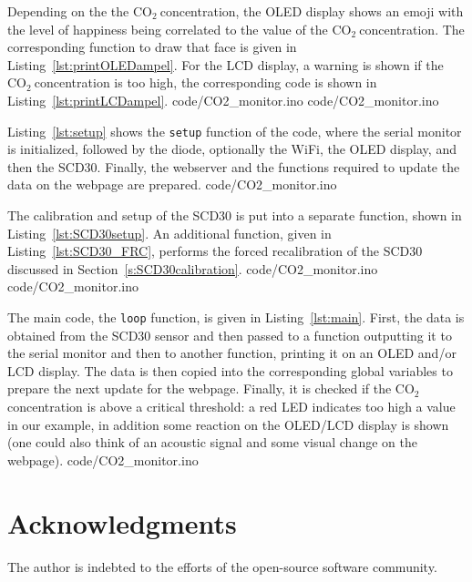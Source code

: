 \documentclass[12pt,a4paper]{article}
\newcommand{\coo}{\ensuremath{\mathrm{CO_2}~}}
\begin{document}
Depending on the the \coo concentration, the OLED display shows an emoji with the level of happiness being correlated to the value of the \coo concentration. The corresponding function to draw that face is given in Listing~\ref{lst:printOLEDampel}. For the LCD display, a warning is shown if the \coo concentration is too high, the corresponding code is shown in Listing~\ref{lst:printLCDampel}.
%
{code/CO2_monitor.ino} 
%
{code/CO2_monitor.ino} 

Listing~\ref{lst:setup} shows the \texttt{setup} function of the code, where the serial monitor is initialized, followed by the diode, optionally the WiFi, the OLED display, and then the SCD30. Finally, the webserver and the functions required to update the data on the webpage are prepared.
%
{code/CO2_monitor.ino}

The calibration and setup of the SCD30 is put into a separate function, shown in Listing~\ref{lst:SCD30setup}. An additional function, given in Listing~\ref{lst:SCD30_FRC}, performs the forced recalibration of the SCD30 discussed in Section~\ref{s:SCD30calibration}.
%
{code/CO2_monitor.ino}
%
{code/CO2_monitor.ino}

The main code, the \texttt{loop} function, is given in Listing~\ref{lst:main}. First, the data is obtained from the SCD30 sensor and then passed to a function outputting it to the serial monitor and then to another function, printing it on an OLED and/or LCD display. The data is then copied into the corresponding global variables to prepare the next update for the webpage. Finally, it is checked if the \coo concentration is above a critical threshold: a red LED indicates too high a value in our example, in addition some reaction on the OLED/LCD display is shown (one could also think of an acoustic signal and some visual change on the webpage).
%
{code/CO2_monitor.ino} 


\section*{Acknowledgments}
The author is indebted to the efforts of the open-source software community.



\end{document}
